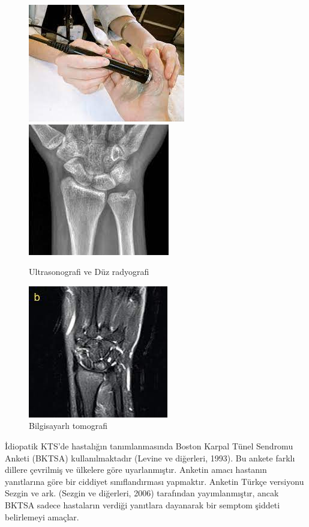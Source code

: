 \documentclass[12pt,twoside]{deuthesis}
\begin{document}
\begin{figure}

{\centering \includegraphics[width=0.49\linewidth,height=0.22\textheight]{figure/ultraradyo} \includegraphics[width=0.49\linewidth,height=0.22\textheight]{figure/radyog} 

}

\caption{Ultrasonografi ve Düz radyografi }\label{fig:unnamed-chunk-5}
\end{figure}
\begin{figure}

{\centering \includegraphics[width=0.49\linewidth,height=0.22\textheight]{figure/bt} 

}

\caption{Bilgisayarlı tomografi }\label{fig:unnamed-chunk-6}
\end{figure}
İdiopatik KTS'de hastalığın tanımlanmasında Boston Karpal Tünel Sendromu
Anketi (BKTSA) kullanılmaktadır (Levine ve diğerleri, 1993). Bu ankete farklı dillere çevrilmiş ve ülkelere göre uyarlanmıştır. Anketin amacı hastanın yanıtlarına göre bir ciddiyet sınıflandırması yapmaktır. Anketin Türkçe versiyonu Sezgin ve ark. (Sezgin ve diğerleri, 2006) tarafından yayımlanmıştır, ancak BKTSA sadece hastaların verdiği yanıtlara dayanarak bir semptom şiddeti belirlemeyi amaçlar.
\end{document}
